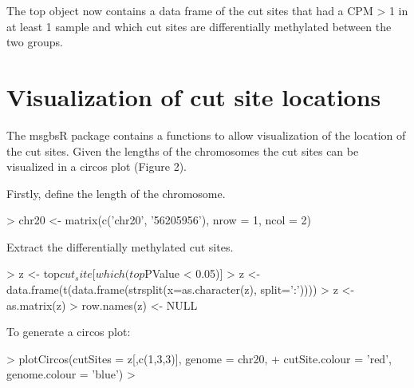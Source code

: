 \documentclass{article}
\begin{document}
The top object now contains a data frame of the cut sites that had a CPM > 1 in at least 1 sample and which cut sites are differentially methylated between the two groups.

\section{Visualization of cut site locations}

The msgbsR package contains a functions to allow visualization of the location of the cut sites. Given the lengths of the chromosomes the cut sites can be visualized in a circos plot (Figure 2).

Firstly, define the length of the chromosome.
\begin{Schunk}
\begin{Sinput}
> chr20 <- matrix(c('chr20', '56205956'), nrow = 1, ncol = 2)
\end{Sinput}
\end{Schunk}

Extract the differentially methylated cut sites.
\begin{Schunk}
\begin{Sinput}
> z <- top$cut_site[which(top$PValue < 0.05)]
> z <- data.frame(t(data.frame(strsplit(x=as.character(z), split=':'))))
> z <- as.matrix(z)
> row.names(z) <- NULL
\end{Sinput}
\end{Schunk}

To generate a circos plot:
\begin{Schunk}
\begin{Sinput}
> plotCircos(cutSites = z[,c(1,3,3)], genome = chr20,
+            cutSite.colour = 'red', genome.colour = 'blue')
> 
\end{Sinput}
\end{Schunk}
\end{document}
